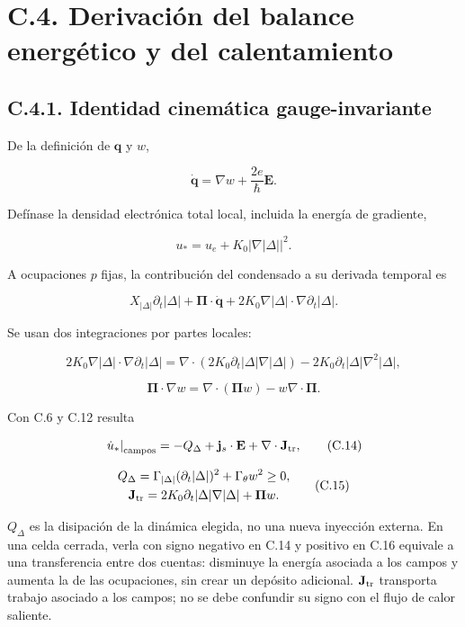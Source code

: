 \documentclass[
  spanish,
  10pt,
  a4paper,
]{article}
\begin{document}
\section{C.4. Derivación del balance energético y del
calentamiento}\label{c.4.-derivaciuxf3n-del-balance-energuxe9tico-y-del-calentamiento}

\subsection{C.4.1. Identidad cinemática
gauge-invariante}\label{c.4.1.-identidad-cinemuxe1tica-gauge-invariante}

De la definición de \(\mathbf q\) y \(w\),

\[
\dot{\mathbf q}=\nabla w+\frac{2e}{\hbar}\mathbf E. \tag{C.12}
\]


Defínase la densidad electrónica total local, incluida la energía de
gradiente,

\[
u_* =u_e+K_0|\nabla |\Delta||^2.
\]

A ocupaciones \(p\) fijas, la contribución del condensado a su derivada
temporal es

\[
X_{|\Delta|}\partial_t|\Delta|+\boldsymbol\Pi\cdot\dot{\mathbf q}
+2K_0\nabla |\Delta|\cdot\nabla\partial_t|\Delta|. \tag{C.13}
\]

Se usan dos integraciones por partes locales:

\[
2K_0\nabla |\Delta|\cdot\nabla\partial_t|\Delta|
=\nabla\cdot(2K_0\partial_t|\Delta|\nabla |\Delta|)-2K_0\partial_t|\Delta|\nabla^2|\Delta|,
\]

\[
\boldsymbol\Pi\cdot\nabla w
=\nabla\cdot(\boldsymbol\Pi w)-w\nabla\cdot\boldsymbol\Pi.
\]

Con C.6 y C.12 resulta

\[
\left.\dot u_*\right|_{\rm campos}
=-Q_\Delta+\mathbf j_s\cdot\mathbf E
+\nabla\cdot\mathbf J_{\rm tr}, \tag{C.14}
\]

\[
\begin{gathered}
Q_\Delta=\Gamma_{|\Delta|}(\partial_t|\Delta|)^2+\Gamma_\theta w^2\geq0,\\
\mathbf J_{\rm tr}=2K_0\partial_t|\Delta|\nabla |\Delta|+\boldsymbol\Pi w.
\end{gathered} \tag{C.15}
\]

\(Q_\Delta\) es la disipación de la dinámica elegida, no una nueva
inyección externa. En una celda cerrada, verla con signo negativo en
C.14 y positivo en C.16 equivale a una transferencia entre dos cuentas:
disminuye la energía asociada a los campos y aumenta la de las
ocupaciones, sin crear un depósito adicional. \(\mathbf J_{\rm tr}\)
transporta trabajo asociado a los campos; no se debe confundir su signo
con el flujo de calor saliente.
\end{document}
